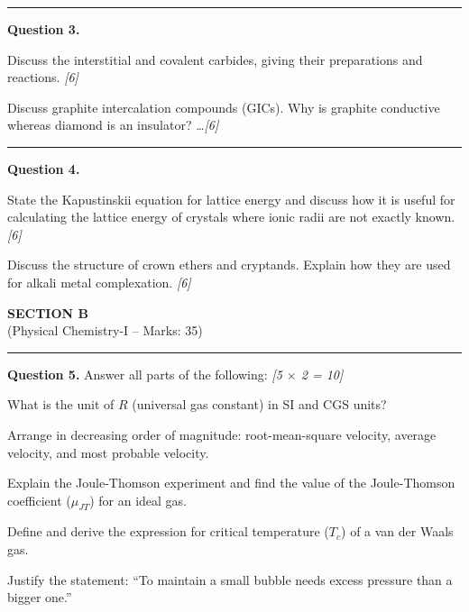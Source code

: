 \documentclass[11pt,a4paper]{article}
\newcommand{\pts}[1]{\hfill   \textit{[#1]}}
\begin{document}
\medskip\rule{\linewidth}{0.2pt}




\noindent   \textbf{Question 3.}

\begin{parts}
  \item Discuss the interstitial and covalent carbides, giving their preparations and reactions. \pts{6}
  \item Discuss graphite intercalation compounds (GICs). Why is graphite conductive whereas diamond is an insulator? \dots \pts{6}
\end{parts}

\medskip\rule{\linewidth}{0.2pt}




\noindent   \textbf{Question 4.}

\begin{parts}
  \item State the Kapustinskii equation for lattice energy and discuss how it is useful for calculating the lattice energy of crystals where ionic radii are not exactly known. \pts{6}
  \item Discuss the structure of crown ethers and cryptands. Explain how they are used for alkali metal complexation. \pts{6}
\end{parts}


\newpage

\begin{center}
  {\large\bfseries SECTION B}\\[2pt]
  {\normalsize (Physical Chemistry-I -- Marks: 35)}
\end{center}
\rule{0.4\linewidth}{0.2pt}
\smallskip




\noindent   \textbf{Question 5.} Answer all parts of the following: \pts{5 $ \times$ 2 = 10}

\begin{parts}
  \item What is the unit of $R$ (universal gas constant) in SI and CGS units?
  \item Arrange in decreasing order of magnitude: root-mean-square velocity, average velocity, and most probable velocity.
  \item Explain the Joule-Thomson experiment and find the value of the Joule-Thomson coefficient ($\mu_{JT}$) for an ideal gas.
  \item Define and derive the expression for critical temperature ($T_c$) of a van der Waals gas.
  \item Justify the statement: ``To maintain a small bubble needs excess pressure than a bigger one.''
\end{parts}
\end{document}
